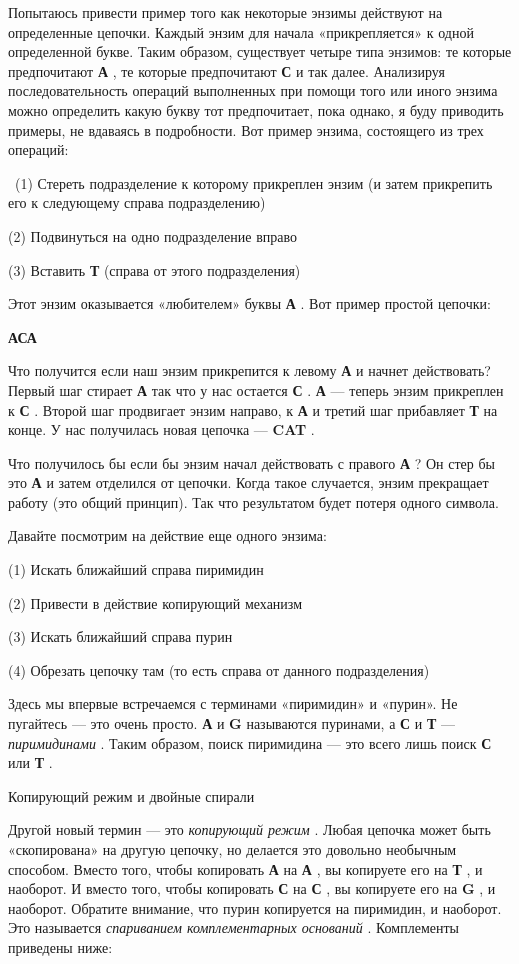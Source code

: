 \documentclass[../main.tex]{subfiles}
\begin{document}
Попытаюсь привести пример того как некоторые энзимы действуют на определенные цепочки. Каждый энзим для начала «прикрепляется» к одной определенной букве. Таким образом, существует четыре типа энзимов: те которые предпочитают \textbf{А} , те которые предпочитают \textbf{С} и так далее. Анализируя последовательность операций выполненных при помощи того или иного энзима можно определить какую букву тот предпочитает, пока однако, я буду приводить примеры, не вдаваясь в подробности. Вот пример энзима, состоящего из трех операций:

~(1) Стереть подразделение к которому прикреплен энзим (и затем прикрепить его к следующему справа подразделению)

(2) Подвинуться на одно подразделение вправо

(3) Вставить \textbf{Т} (справа от этого подразделения)

Этот энзим оказывается «любителем» буквы \textbf{А} . Вот пример простой цепочки:

\textbf{АСА}

Что получится если наш энзим прикрепится к левому \textbf{А} и начнет действовать? Первый шаг стирает \textbf{А} так что у нас остается \textbf{С} . \textbf{А} --- теперь энзим прикреплен к \textbf{С} . Второй шаг продвигает энзим направо, к \textbf{А} и третий шаг прибавляет \textbf{Т} на конце. У нас получилась новая цепочка --- \textbf{CAT} .

Что получилось бы если бы энзим начал действовать с правого \textbf{А} ? Он стер бы это \textbf{А} и затем отделился от цепочки. Когда такое случается, энзим прекращает работу (это общий принцип). Так что результатом будет потеря одного символа.

Давайте посмотрим на действие еще одного энзима:

(1) Искать ближайший справа пиримидин

(2) Привести в действие копирующий механизм

(3) Искать ближайший справа пурин

(4) Обрезать цепочку там (то есть справа от данного подразделения)

Здесь мы впервые встречаемся с терминами «пиримидин» и «пурин». Не пугайтесь --- это очень просто. \textbf{А} и \textbf{G} называются пуринами, а \textbf{С} и \textbf{Т} --- \emph{пиримидинами} . Таким образом, поиск пиримидина --- это всего лишь поиск \textbf{С} или \textbf{Т} .

Копирующий режим и двойные спирали

Другой новый термин --- это \emph{копирующий режим} . Любая цепочка может быть «скопирована» на другую цепочку, но делается это довольно необычным способом. Вместо того, чтобы копировать \textbf{А} на \textbf{А} , вы копируете его на \textbf{Т} , и наоборот. И вместо того, чтобы копировать \textbf{С} на \textbf{С} , вы копируете его на \textbf{G} , и наоборот. Обратите внимание, что пурин копируется на пиримидин, и наоборот. Это называется \emph{спариванием комплементарных оснований} . Комплементы приведены ниже:
\end{document}
